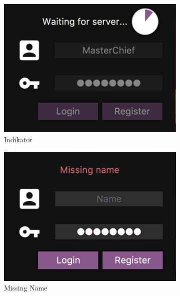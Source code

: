 \documentclass[12pt, titlepage]{scrartcl}
\begin{document}
			    \begin{figure}[H]
                    \centering
                    \begin{subfigure}[h]{0.3\linewidth}
                        \includegraphics[width=\linewidth]{images/old_state/login/Indicator.png}
                        \caption{Indikator}
                    \end{subfigure}
                    \begin{subfigure}[h]{0.3\linewidth}
                        \includegraphics[width=\linewidth]{images/old_state/login/MissingName.png}
                        \caption{Missing Name}
                    \end{subfigure}
                    \begin{subfigure}[h]{0.3\linewidth}

\end{subfigure}
\end{figure}
\end{document}

